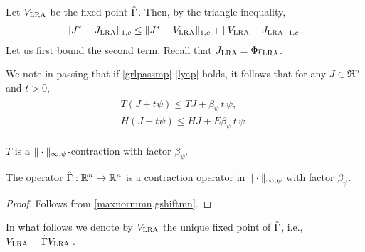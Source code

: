 \documentclass[12pt,draftcls,onecolumn]{IEEEtran}
\begin{document}
Let $V_{\text{\sc LRA}}$ be the fixed point $\hat{\Gamma}$.
Then, by the triangle inequality,
\begin{align*}
\|J^*-J_{\text{\sc LRA}}\|_{1,c} \le \|J^*-V_{\text{\sc LRA}}\|_{1,c} +\|V_{\text{\sc LRA}}-J_{\text{\sc LRA}}\|_{1,c}\,.
\end{align*}
Let us first bound the second term. Recall that $J_{\text{\sc LRA}} = \Phi r_{\text{\sc LRA}}$.

We note in passing that if \cref{grlpassmp}-\eqref{lyap} holds, it follows that for any $J\in \Re^n$ and $t>0$,
\begin{align}\label{eq:psilin}
\begin{split}
T(J+ t \psi ) \le TJ + \beta_{\psi}\,t\,  \psi,\\
H(J+ t \psi ) \le HJ + E \beta_{\psi}\,t\,  \psi\,.
\end{split}
\end{align}
\fi
%

\noindent



\begin{corollary}\label{tmaxnormmn}
$T$ is a $\|\cdot\|_{\infty,\psi}$-contraction with factor $\beta_{\psi}$.
\end{corollary}

\begin{comment}
\begin{theorem}\label{gmaxcontramn}
The operator $\Gamma  \colon \Re^n\ra \Re^n$ is a contraction operator in $\norm{\cdot}_{\mn}$ with factor $\beta_{\psi}$.
\end{theorem}
\end{comment}
\begin{theorem}\label{hgmaxcontramn}
The operator $\hat{\Gamma}:\mathbb{R}^n\to\mathbb{R}^n$  is a contraction operator in $\|\cdot\|_{\infty,\psi}$ with factor $\beta_{\psi}$.
\end{theorem}
\begin{proof}
Follows from \cref{maxnormmn,gshiftmn}.
\begin{comment}
We already know that $\hg$ is monotone. That $\hg$ satisfies~\cref{eq:shiftmn}
with $\beta = \beta_{\psi}$ follows similarly to the argument used in  \cref{tgshift}
with modifications similar to those introduced in the proof of \cref{gshiftmn}.
Then, \cref{gmaxcontramn} gives the desired result.
\end{comment}
\end{proof}
In what follows we denote by $V_{\text{\sc LRA}}$ the unique fixed point of $\hat{\Gamma}$, i.e., $V_{\text{\sc LRA}} = \hat{\Gamma} V_{\text{\sc LRA}}\,$.
\end{document}
